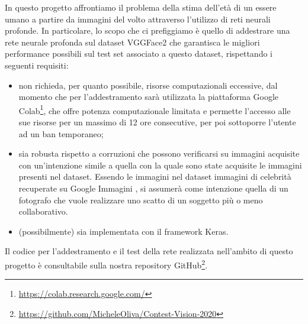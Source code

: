 In questo progetto affrontiamo il problema della stima dell'età di un essere umano a partire da immagini del volto attraverso l'utilizzo di reti neurali profonde. 
In particolare, lo scopo che ci prefiggiamo è quello di addestrare una rete neurale profonda sul dataset VGGFace2 \cite{vggface2dataset} che garantisca le migliori performance possibili sul test set associato a questo dataset, rispettando i seguenti requisiti:

\begin{itemize}
	\item non richieda, per quanto possibile, risorse computazionali eccessive, dal momento che per l'addestramento sarà utilizzata la piattaforma Google Colab\footnote{\url{https://colab.research.google.com/}}, che offre potenza computazionale limitata e permette l'accesso alle sue risorse per un massimo di 12 ore consecutive, per poi sottoporre l'utente ad un ban temporaneo; 
	\item sia robusta rispetto a corruzioni che possono verificarsi su immagini acquisite con un'intenzione simile a quella con la quale sono state acquisite le immagini presenti nel dataset.
Essendo le immagini nel dataset immagini di celebrità recuperate su Google Immagini \cite{vggface2dataset}, si assumerà come intenzione quella di un fotografo che vuole realizzare uno scatto di un soggetto più o meno collaborativo.
	\item (possibilmente) sia implementata con il framework Keras.
\end{itemize}

Il codice per l’addestramento e il test della rete realizzata nell’ambito di questo progetto è consultabile sulla nostra repository GitHub\footnote{\url{https://github.com/MicheleOliva/Contest-Vision-2020}}.